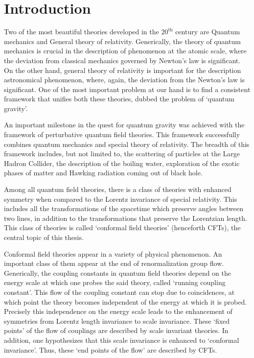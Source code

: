 
\chapter{Introduction}
\label{part:Introduction}

Two of the most beautiful theories developed in the $ 20 ^{\text{th}} $ century are Quantum mechanics and General theory of relativity.
Generically, the theory of quantum mechanics is crucial in the description of phenomenon at the atomic scale, where the deviation from classical mechanics governed by Newton's law is significant.
On the other hand, general theory of relativity is important for the description astronomical phenomenon, where, again, the deviation from the Newton's law is significant.
One of the most important problem at our hand is to find a consistent framework that unifies both these theories, dubbed the problem of `quantum gravity'.

An important milestone in the quest for quantum gravity was achieved with the framework of perturbative quantum field theories.
This framework successfully combines quantum mechanics and special theory of relativity.
The breadth of this framework includes, but not limited to, the scattering of particles at the Large Hadron Collider, the description of the boiling water, exploration of the exotic phases of matter and Hawking radiation coming out of black hole.

Among all quantum field theories, there is a class of theories with enhanced symmetry when compared to the Lorentz invariance of special relativity.
This includes all the transformations of the spacetime which preserve angles between two lines, in addition to the transformations that preserve the Lorentzian length.
This class of theories is called `conformal field theories' (henceforth CFTs), the central topic of this thesis.

Conformal field theories appear in a variety of physical phenomenon.
An important class of them appear at the end of renormalization group flow.
Generically, the coupling constants in quantum field theories depend on the energy scale at which one probes the said theory, called `running coupling constant'.
This flow of the coupling constant can stop due to coincidences, at which point the theory becomes independent of the energy at which it is probed.
Precisely this independence on the energy scale leads to the enhancement of symmetries from Lorentz length invariance to scale invariance.
These `fixed points' of the flow of couplings are described by scale invariant theories.
In addition, one hypothesizes that this scale invariance is enhanced to `conformal invariance'.
Thus, these `end points of the flow' are described by CFTs.

